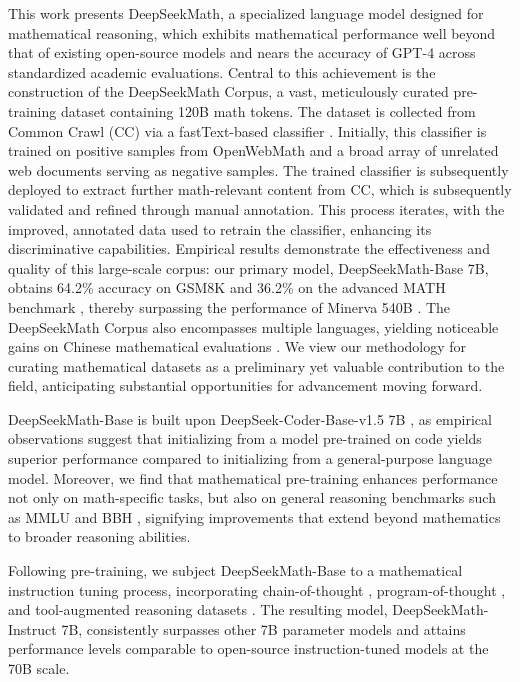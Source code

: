 This work presents DeepSeekMath, a specialized language model designed for mathematical reasoning, which exhibits mathematical performance well beyond that of existing open-source models and nears the accuracy of GPT-4 across standardized academic evaluations. Central to this achievement is the construction of the DeepSeekMath Corpus, a vast, meticulously curated pre-training dataset containing 120B math tokens. The dataset is collected from Common Crawl (CC) via a fastText-based classifier \citep{joulin2016fasttext}. Initially, this classifier is trained on positive samples from OpenWebMath \citep{openwebmath} and a broad array of unrelated web documents serving as negative samples. The trained classifier is subsequently deployed to extract further math-relevant content from CC, which is subsequently validated and refined through manual annotation. This process iterates, with the improved, annotated data used to retrain the classifier, enhancing its discriminative capabilities. Empirical results demonstrate the effectiveness and quality of this large-scale corpus: our primary model, DeepSeekMath-Base 7B, obtains 64.2\% accuracy on GSM8K \citep{gsm8k} and 36.2\% on the advanced MATH benchmark \citep{MATH}, thereby surpassing the performance of Minerva 540B \citep{minerva}. The DeepSeekMath Corpus also encompasses multiple languages, yielding noticeable gains on Chinese mathematical evaluations \citep{wei2023cmath,agieval}. We view our methodology for curating mathematical datasets as a preliminary yet valuable contribution to the field, anticipating substantial opportunities for advancement moving forward.

DeepSeekMath-Base is built upon DeepSeek-Coder-Base-v1.5 7B \citep{deepseek-coder}, as empirical observations suggest that initializing from a model pre-trained on code yields superior performance compared to initializing from a general-purpose language model. Moreover, we find that mathematical pre-training enhances performance not only on math-specific tasks, but also on general reasoning benchmarks such as MMLU \citep{mmlu} and BBH \citep{bbh}, signifying improvements that extend beyond mathematics to broader reasoning abilities.

Following pre-training, we subject DeepSeekMath-Base to a mathematical instruction tuning process, incorporating chain-of-thought \citep{cot}, program-of-thought \citep{pot,pal}, and tool-augmented reasoning datasets \citep{tora}. The resulting model, DeepSeekMath-Instruct 7B, consistently surpasses other 7B parameter models and attains performance levels comparable to open-source instruction-tuned models at the 70B scale.

